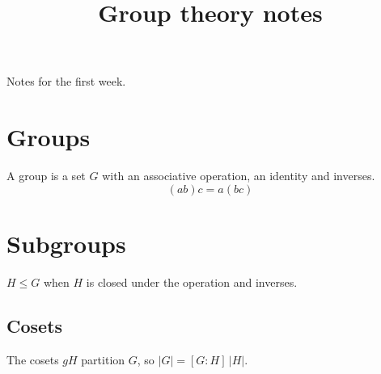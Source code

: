 \documentclass{article}
\title{Group theory notes}
\begin{document}
\maketitle
Notes for the first week.
\section{Groups}
A group is a set $G$ with an associative operation, an identity and inverses.
$$ (ab)c = a(bc) $$
\section{Subgroups}
$H \le G$ when $H$ is closed under the operation and inverses.
\subsection{Cosets}
The cosets $gH$ partition $G$, so $|G| = [G:H]\,|H|$.
\end{document}
